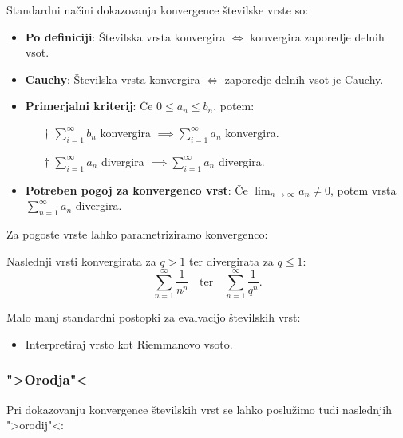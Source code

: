 \documentclass[12pt, a4paper, unicode]{article}
\begin{document}
\begin{nasvet}
Standardni načini dokazovanja konvergence številske vrste so:
\begin{itemize}
    \item \textbf{Po definiciji}: Številska vrsta konvergira $\iff$ konvergira zaporedje delnih vsot.
    \item \textbf{Cauchy}: Številska vrsta konvergira $\iff$ zaporedje delnih vsot je Cauchy.
    \item \textbf{Primerjalni kriterij}: Če $0 \leq a_n \leq b_n$, potem:
        \begin{itemize}
            \item[$\dagger$] $\sum_{i = 1}^{\infty}b_n$ konvergira $\implies \sum_{i = 1}^{\infty}a_n$ konvergira.
            \item[$\dagger$] $\sum_{i = 1}^{\infty}a_n$ divergira $\implies \sum_{i = 1}^{\infty}a_n$ divergira.
        \end{itemize}
    \item \textbf{Potreben pogoj za konvergenco vrst}: \newline Če $\lim_{n \to \infty} a_n \neq 0$, potem vrsta $\sum_{n = 1}^{\infty} a_n$ divergira.
\end{itemize}
\end{nasvet}

Za pogoste vrste lahko parametriziramo konvergenco:
\begin{izrek}
Naslednji vrsti konvergirata za $q > 1$ ter divergirata za $q \leq 1$:
$$\sum_{n=1}^{\infty} \frac{1}{n^p} \quad \text{ter} \quad \sum_{n=1}^{\infty} \frac{1}{q^n}.$$
\end{izrek}

\begin{nasvet}
Malo manj standardni postopki za evalvacijo številskih vrst:
\begin{itemize}
    \item Interpretiraj vrsto kot Riemmanovo vsoto.
\end{itemize}
\end{nasvet}

\subsubsection{">Orodja"<}
Pri dokazovanju konvergence številskih vrst se lahko poslužimo tudi naslednjih ">orodij"<:
\end{document}
